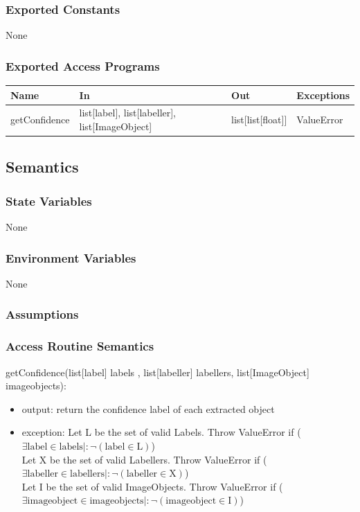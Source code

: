 \documentclass[12pt, titlepage]{article}
\begin{document}
  
  \subsubsection{Exported Constants}
  None
  \subsubsection{Exported Access Programs}
  
  \begin{center}
  \begin{tabular}{p{2cm} p{4cm} p{4cm} p{2cm}}
  \hline
  \textbf{Name} & \textbf{In} & \textbf{Out} & \textbf{Exceptions} \\
  \hline
  getConfidence & list[label], list[labeller], list[ImageObject] & list[list[float]]  & ValueError \\
  
  \end{tabular}
  \end{center}
  
  \subsection{Semantics}
  
  \subsubsection{State Variables}
  
 None
  
  \subsubsection{Environment Variables}
  
  None
  
  \subsubsection{Assumptions}
  
  
  \subsubsection{Access Routine Semantics}
  
  \noindent getConfidence(list[label] labels , list[labeller] labellers, list[ImageObject] imageobjects):
  \begin{itemize}
  \item output: return the confidence label of each extracted object
  \item exception: Let L be the set of valid Labels. Throw ValueError if ($\exists \text{label} \in \text{labels} |: \neg (\text{label} \in \text{L})$)\\
  Let X be the set of valid Labellers. Throw ValueError if ($\exists \text{labeller} \in \text{labellers} |: \neg (\text{labeller} \in \text{X})$)\\
  Let I be the set of valid ImageObjects. Throw ValueError if ($\exists \text{imageobject} \in \text{imageobjects} |: \neg (\text{imageobject} \in \text{I})$)\\
  \end{itemize}
\end{document}
